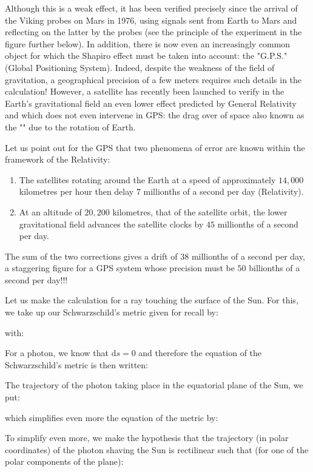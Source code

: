 	Although this is a weak effect, it has been verified precisely since the arrival of the Viking probes on Mars in 1976, using signals sent from Earth to Mars and reflecting on the latter by the probes (see the principle of the experiment in the figure further below). In addition, there is now even an increasingly common object for which the Shapiro effect must be taken into account: the "G.P.S." (Global Positioning System). Indeed, despite the weakness of the field of gravitation, a geographical precision of a few meters requires such details in the calculation! However, a satellite has recently been launched to verify in the Earth's gravitational field an even lower effect predicted by General Relativity and which does not even intervene in GPS: the drag over of space also known as the "" due to the rotation of Earth.
	
	Let us point out for the GPS that two phenomena of error are known within the framework of the Relativity:
	\begin{enumerate}
		\item The satellites rotating around the Earth at a speed of approximately $14,000$ kilometres per hour then delay $7$ millionths of a second per day (Relativity).

		\item At an altitude of $20,200$ kilometres, that of the satellite orbit, the lower gravitational field advances the satellite clocks by $45$ millionths of a second per day.
	\end{enumerate}
	The sum of the two corrections gives a drift of $38$ millionths of a second per day, a staggering figure for a GPS system whose precision must be $50$ billionths of a second per day!!!

	Let us make the calculation for a ray touching the surface of the Sun. For this, we take up our Schwarzschild's metric given for recall by:
	
	with:
	
	For a photon, we know that $\mathrm{d}s=0$ and therefore the equation of the Schwarzschild's metric is then written:
	
	The trajectory of the photon taking place in the equatorial plane of the Sun, we put:
	
	which simplifies even more the equation of the metric by:
	
	To simplify even more, we make the hypothesis that the trajectory (in polar coordinates) of the photon shaving the Sun is rectilinear such that (for one of the polar components of the plane):
	

